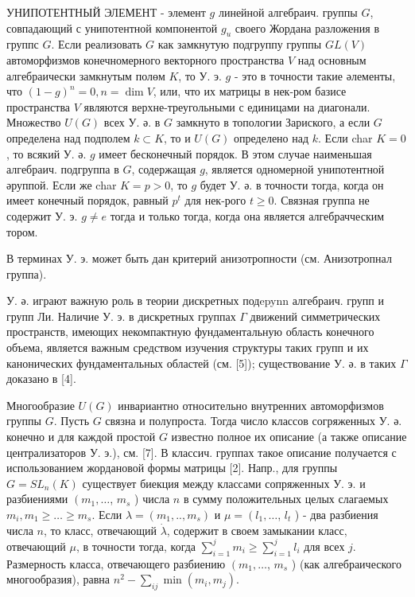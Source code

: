 \documentclass[10pt]{article}
\begin{document}
УНИПОТЕНТНЫЙ ЭЛЕМЕНТ - элемент $g$ линейной алгебраич. группы $G$, совпадающий с унипотентной компонентой $g_{u}$ своего Жордана разложения в группс $G$. Если реализовать $G$ как замкнутую подгруппу группы $G L(V)$ автоморфизмов конечномерного векторного пространства $V$ над основным алгебраически замкнутым полөм $K$, то У. э. $g$ - это в точности такие әлементы, что $(1-g)^{n}=0, n=\operatorname{dim} V$, или, что их матрицы в нек-ром базисе пространства $V$ являются верхне-треугольными с единицами на диагонали. Множество $U(G)$ всех У. ә. в $G$ замкнуто в топологии Зариского, а если $G$ определена над подполем $k \subset K$, то и $U(G)$ определено над $k$. Если char $K=0$, то всякий У. ә. $g$ имеет бесконечный порядок. В этом случае наименьшая алгебраич. подгруппа в $G$, содержащая $g$, является одномерной унипотентной әруппой. Если же char $K=p>0$, то $g$ будет У. ә. в точности тогда, когда он имеет конечный порядок, равный $p^{t}$ для нек-рого $t \geqslant 0$. Связная группа не содержит $У$. э. $g \neq e$ тогда и только тогда, когда она является алгебрачческим тором.



В терминах У. э. может быть дан критерий анизотропности (см. Анизотропнал группа).



У. ә. играют важную роль в теории дискретных подepynn алгебраич. групп и групп Ли. Наличие У. э. в дискретных группах $\Gamma$ движений симметрических пространств, имеющих некомпактную фундаментальную область конечного объема, является важным средством изучения структуры таких групп и их канонических фундаментальных областей (см. [5]); существование У. ә. в таких $\Gamma$ доказано в [4].



Многообразие $U(G)$ инвариантно относительно внутренних автоморфизмов группы $G$. Пусть $G$ связна и полупроста. Тогда число классов согряженных У. ә. конечно и для каждой простой $G$ известно полное их описание (а также описание централизаторов У. э.), см. [7]. В классич. группах такое описание получается с использованием жордановой формы матрицы [2]. Напр., для группы $G=S L_{n}(K)$ существует биекция между классами сопряженных У. э. и разбиениями $\left(m_{1}, \ldots\right.$, $m_{s}$ ) числа $n$ в сумму положительных целых слагаемых $m_{i}, m_{1} \geqslant \ldots \geqslant m_{s}$. Если $\lambda=\left(m_{1}, . ., m_{s}\right)$ и $\mu=\left(l_{1}, \ldots\right.$, $l_{t}$ ) - два разбиения числа $n$, то класс, отвечающий $\dot{\lambda}$, содержит в своем замыкании класс, отвечающий $\mu$, в точности тогда, когда $\sum_{i=1}^{j} m_{i} \geqslant \sum_{i=1}^{j} l_{i}$ для всех $j$. Размерность класса, отвечающего разбиению $\left(m_{1}, \ldots\right.$, $m_{s}$ ) (как алгебраического многообразия), равна $n^{2}-\sum_{i j} \min \left(m_{i}, m_{j}\right)$.
\end{document}
